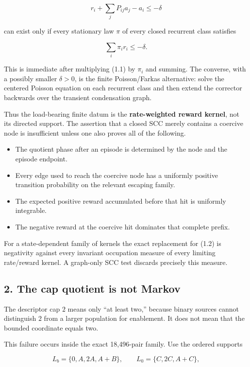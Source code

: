 \[
 r_i+\sum_jP_{ij}a_j-a_i\le-\delta                 \tag{1.1}
\]

can exist only if every stationary law \(\pi\) of every closed recurrent
class satisfies

\[
                         \sum_i\pi_i r_i\le-\delta . \tag{1.2}
\]

This is immediate after multiplying (1.1) by \(\pi_i\) and summing. The
converse, with a possibly smaller \(\delta>0\), is the finite
Poisson/Farkas alternative: solve the centered Poisson equation on each
recurrent class and then extend the corrector backwards over the
transient condensation graph.

Thus the load-bearing finite datum is the \textbf{rate-weighted reward
kernel}, not its directed support. The assertion that a closed SCC
merely contains a coercive node is insufficient unless one also proves
all of the following.

\begin{itemize}
\tightlist
\item
  The quotient phase after an episode is determined by the node and the
  episode endpoint.
\item
  Every edge used to reach the coercive node has a uniformly positive
  transition probability on the relevant escaping family.
\item
  The expected positive reward accumulated before that hit is uniformly
  integrable.
\item
  The negative reward at the coercive hit dominates that complete
  prefix.
\end{itemize}

For a state-dependent family of kernels the exact replacement for (1.2)
is negativity against every invariant occupation measure of every
limiting rate/reward kernel. A graph-only SCC test discards precisely
this measure.

\subsection{2. The cap quotient is not
Markov}

The descriptor cap \(2\) means only ``at least two,'' because binary
sources cannot distinguish \(2\) from a larger population for
enablement. It does not mean that the bounded coordinate equals two.

This failure occurs inside the exact 18,496-pair family. Use the ordered
supports

\[
 L_b=\{0,A,2A,A+B\},\qquad
 L_0=\{C,2C,A+C\},                                  \tag{2.1}
\]

